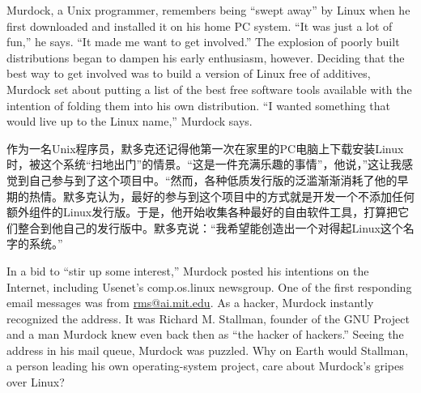 \ifdefined\eng
Murdock, a Unix programmer, remembers being ``swept away'' by Linux when he first downloaded and installed it on his home PC system. ``It was just a lot of fun,'' he says. ``It made me want to get involved.'' The explosion of poorly built distributions began to dampen his early enthusiasm, however. Deciding that the best way to get involved was to build a version of Linux free of additives, Murdock set about putting a list of the best free software tools available with the intention of folding them into his own distribution. ``I wanted something that would live up to the Linux name,'' Murdock says.
\fi

\ifdefined\chs
作为一名Unix程序员，默多克还记得他第一次在家里的PC电脑上下载安装Linux时，被这个系统``扫地出门''的情景。``这是一件充满乐趣的事情''，他说，''这让我感觉到自己参与到了这个项目中。``然而，各种低质发行版的泛滥渐渐消耗了他的早期的热情。默多克认为，最好的参与到这个项目中的方式就是开发一个不添加任何额外组件的Linux发行版。于是，他开始收集各种最好的自由软件工具，打算把它们整合到他自己的发行版中。默多克说：``我希望能创造出一个对得起Linux这个名字的系统。''
\fi

\ifdefined\eng
In a bid to ``stir up some interest,'' Murdock posted his intentions on the Internet, including Usenet's comp.os.linux newsgroup. One of the first responding email messages was from \url{rms@ai.mit.edu}. As a hacker, Murdock instantly recognized the address. It was Richard M. Stallman, founder of the GNU Project and a man Murdock knew even back then as ``the hacker of hackers.'' Seeing the address in his mail queue, Murdock was puzzled. Why on Earth would Stallman, a person leading his own operating-system project, care about Murdock's gripes over Linux?
\fi

